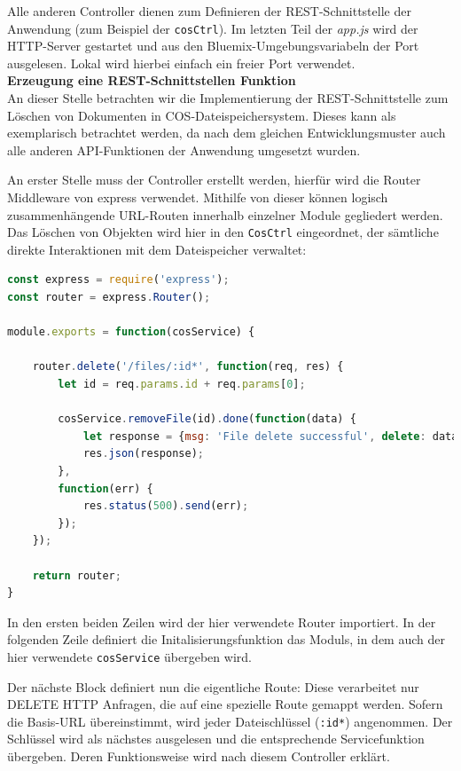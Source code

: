 Alle anderen Controller dienen zum Definieren der REST-Schnittstelle der Anwendung (zum Beispiel der \lstinline|cosCtrl|). Im letzten Teil der \textit{app.js} wird der HTTP-Server gestartet und aus den Bluemix-Umgebungsvariabeln der Port ausgelesen. Lokal wird hierbei einfach ein freier Port verwendet.\\

\textbf{Erzeugung eine REST-Schnittstellen Funktion}\\
An dieser Stelle betrachten wir die Implementierung der REST-Schnittstelle zum Löschen von Dokumenten in \ac{COS}-Dateispeichersystem. Dieses kann als exemplarisch betrachtet werden, da nach dem gleichen Entwicklungsmuster auch alle anderen API-Funktionen der Anwendung umgesetzt wurden. 

An erster Stelle muss der Controller erstellt werden, hierfür wird die Router Middleware von express verwendet. Mithilfe von dieser können logisch zusammenhängende URL-Routen innerhalb einzelner Module gegliedert werden. Das Löschen von Objekten wird hier in den \lstinline|CosCtrl| eingeordnet, der sämtliche direkte Interaktionen mit dem Dateispeicher verwaltet:\\

\begin{lstlisting}[language=JavaScript, caption=CosCtrl.js mit einer Route zur Dateilöschung]
const express = require('express');
const router = express.Router();

module.exports = function(cosService) {

	router.delete('/files/:id*', function(req, res) {
		let id = req.params.id + req.params[0];

		cosService.removeFile(id).done(function(data) {
			let response = {msg: 'File delete successful', delete: data};
			res.json(response);
		},
		function(err) {
			res.status(500).send(err);
		});
	});

	return router;
}
\end{lstlisting}

In den ersten beiden Zeilen wird der hier verwendete Router importiert. In der folgenden Zeile definiert die Initalisierungsfunktion das Moduls, in dem auch der hier verwendete \lstinline|cosService| übergeben wird.

Der nächste Block definiert nun die eigentliche Route: Diese verarbeitet nur DELETE HTTP Anfragen, die auf eine spezielle Route gemappt werden. Sofern die Basis-URL übereinstimmt, wird jeder Dateischlüssel (\lstinline|:id*|) angenommen. Der Schlüssel wird als nächstes ausgelesen und die entsprechende Servicefunktion übergeben. Deren Funktionsweise wird nach diesem Controller erklärt.

